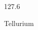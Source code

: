 \documentclass[12pt]{article}
\begin{document}
\hfill{}
\vfill
\begin{center}
  {\fontsize{50}{60}
  }

  127.6

Tellurium
\end{center}
\vfill
\end{document}
